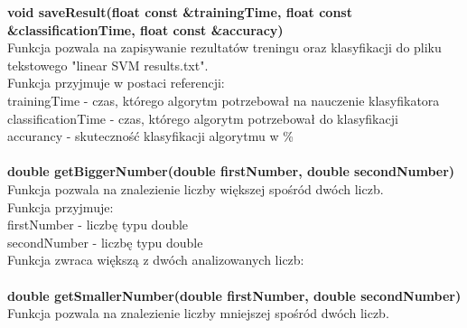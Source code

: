 \documentclass[[10pt,a4paper]{article}
\begin{document}
\newline
\textbf {void saveResult(float const \&trainingTime, float const \&classificationTime, float const \&accuracy)}\\
\newline
\vspace{3mm}Funkcja pozwala na zapisywanie rezultatów treningu oraz klasyfikacji do pliku tekstowego "linear SVM results.txt".\\
\newline
\vspace{3mm}Funkcja przyjmuje w postaci referencji:\\
trainingTime - czas, którego algorytm potrzebował na nauczenie klasyfikatora \\
classificationTime - czas, którego algorytm potrzebował do klasyfikacji\\
accurancy - skuteczność klasyfikacji algorytmu w \% \\
\newline
\newline
\newline
{}\\
\newline
\textbf {double getBiggerNumber(double firstNumber, double secondNumber)}\\
\newline
\vspace{3mm}Funkcja pozwala na znalezienie liczby większej spośród dwóch liczb.\\
\vspace{3mm}Funkcja przyjmuje:\\
firstNumber - liczbę typu double\\
secondNumber - liczbę typu double\\
\newline
\vspace{3mm}Funkcja zwraca większą z dwóch analizowanych liczb:\\
\newline
\newline
\newline
{}\\
\newline
\textbf {double getSmallerNumber(double firstNumber, double secondNumber)}\\
\newline
\vspace{3mm}Funkcja pozwala na znalezienie liczby mniejszej spośród dwóch liczb.\\
\end{document}
